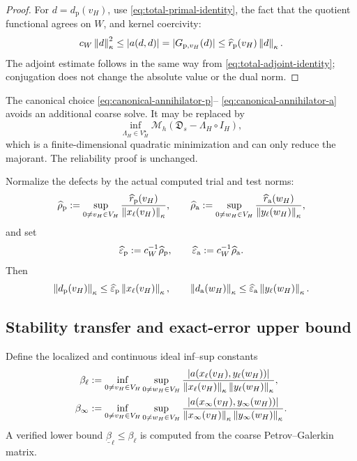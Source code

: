 \begin{proof}
For $d=d_{\mathrm p}(v_H)$, use \eqref{eq:total-primal-identity}, the
fact that the quotient functional agrees on $W$, and kernel coercivity:
\[
  c_W\left\lVert d\right\rVert_\kappa^2
  \leq|a(d,d)|
  =|G_{\mathrm p,v_H}(d)|
  \leq\widehat r_{\mathrm p}(v_H)\left\lVert d\right\rVert_\kappa.
\]
The adjoint estimate follows in the same way from
\eqref{eq:total-adjoint-identity}; conjugation does not change the
absolute value or the dual norm.
\end{proof}

\begin{remark}
\label{rem:optimized-quotient}
The canonical choice \eqref{eq:canonical-annihilator-p}--
\eqref{eq:canonical-annihilator-a} avoids an additional coarse solve.  It
may be replaced by
\[
  \inf_{\Lambda_H\in V_H^\star}
  \mathscr M_h(\mathfrak D_s-\Lambda_H\circ I_H),
\]
which is a finite-dimensional quadratic minimization and can only reduce
the majorant.  The reliability proof is unchanged.
\end{remark}

Normalize the defects by the actual computed trial and test norms:
\begin{equation}
\label{eq:rho-total}
  \widehat\rho_{\mathrm p}
  :=\sup_{0\neq v_H\in V_H}
    \frac{\widehat r_{\mathrm p}(v_H)}
         {\left\lVert x_\ell(v_H)\right\rVert_\kappa},
  \qquad
  \widehat\rho_{\mathrm a}
  :=\sup_{0\neq w_H\in V_H}
    \frac{\widehat r_{\mathrm a}(w_H)}
         {\left\lVert y_\ell(w_H)\right\rVert_\kappa},
\end{equation}
and set
\begin{equation}
\label{eq:epsilon-total}
  \widehat\varepsilon_{\mathrm p}:=c_W^{-1}\widehat\rho_{\mathrm p},
  \qquad
  \widehat\varepsilon_{\mathrm a}:=c_W^{-1}\widehat\rho_{\mathrm a}.
\end{equation}
Then
\begin{equation}
\label{eq:normalized-total-defects}
  \left\lVert d_{\mathrm p}(v_H)\right\rVert_\kappa
  \leq\widehat\varepsilon_{\mathrm p}\left\lVert x_\ell(v_H)\right\rVert_\kappa,
  \qquad
  \left\lVert d_{\mathrm a}(w_H)\right\rVert_\kappa
  \leq\widehat\varepsilon_{\mathrm a}\left\lVert y_\ell(w_H)\right\rVert_\kappa.
\end{equation}

\subsection{Stability transfer and exact-error upper bound}
\label{sec:stability-transfer}

Define the localized and continuous ideal inf--sup constants
\begin{align}
  \beta_\ell
  &:=%
  \inf_{0\neq v_H\in V_H}
  \sup_{0\neq w_H\in V_H}
  \frac{|a(x_\ell(v_H),y_\ell(w_H))|}
       {\norm{x_\ell(v_H)}_\kappa
        \norm{y_\ell(w_H)}_\kappa},
  \label{eq:beta-localized}\\
  \beta_\infty
  &:=%
  \inf_{0\neq v_H\in V_H}
  \sup_{0\neq w_H\in V_H}
  \frac{|a(x_\infty(v_H),y_\infty(w_H))|}
       {\norm{x_\infty(v_H)}_\kappa
        \norm{y_\infty(w_H)}_\kappa}.
  \label{eq:beta-continuous-ideal}
\end{align}
A verified lower bound $\underline\beta_\ell\leq\beta_\ell$ is computed
from the coarse Petrov--Galerkin matrix.

